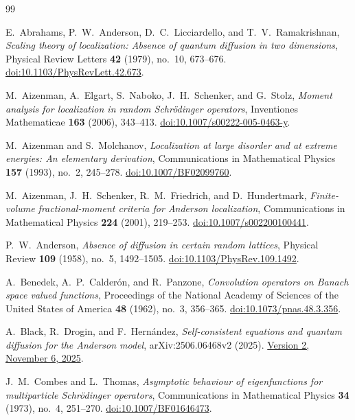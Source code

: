 \begin{thebibliography}{99}

E.~Abrahams, P.~W.~Anderson, D.~C.~Licciardello, and T.~V.~Ramakrishnan,
\emph{Scaling theory of localization: Absence of quantum diffusion in
two dimensions},
Physical Review Letters \textbf{42} (1979), no.~10, 673--676.
\href{https://doi.org/10.1103/PhysRevLett.42.673}{doi:10.1103/PhysRevLett.42.673}.

M.~Aizenman, A.~Elgart, S.~Naboko, J.~H.~Schenker, and G.~Stolz,
\emph{Moment analysis for localization in random Schr\"odinger operators},
Inventiones Mathematicae \textbf{163} (2006), 343--413.
\href{https://doi.org/10.1007/s00222-005-0463-y}{doi:10.1007/s00222-005-0463-y}.

M.~Aizenman and S.~Molchanov,
\emph{Localization at large disorder and at extreme energies:
An elementary derivation},
Communications in Mathematical Physics \textbf{157} (1993), no.~2, 245--278.
\href{https://doi.org/10.1007/BF02099760}{doi:10.1007/BF02099760}.

M.~Aizenman, J.~H.~Schenker, R.~M.~Friedrich, and D.~Hundertmark,
\emph{Finite-volume fractional-moment criteria for Anderson localization},
Communications in Mathematical Physics \textbf{224} (2001), 219--253.
\href{https://doi.org/10.1007/s002200100441}{doi:10.1007/s002200100441}.

P.~W.~Anderson,
\emph{Absence of diffusion in certain random lattices},
Physical Review \textbf{109} (1958), no.~5, 1492--1505.
\href{https://doi.org/10.1103/PhysRev.109.1492}{doi:10.1103/PhysRev.109.1492}.

A.~Benedek, A.~P.~Calder\'on, and R.~Panzone,
\emph{Convolution operators on Banach space valued functions},
Proceedings of the National Academy of Sciences of the United States
of America \textbf{48} (1962), no.~3, 356--365.
\href{https://doi.org/10.1073/pnas.48.3.356}{doi:10.1073/pnas.48.3.356}.

A.~Black, R.~Drogin, and F.~Hern\'andez,
\emph{Self-consistent equations and quantum diffusion for the Anderson model},
arXiv:2506.06468v2 (2025).
\href{https://arxiv.org/abs/2506.06468v2}{Version 2, November 6, 2025}.

J.~M.~Combes and L.~Thomas,
\emph{Asymptotic behaviour of eigenfunctions for multiparticle
Schr\"odinger operators},
Communications in Mathematical Physics \textbf{34} (1973), no.~4, 251--270.
\href{https://doi.org/10.1007/BF01646473}{doi:10.1007/BF01646473}.


\end{thebibliography}
